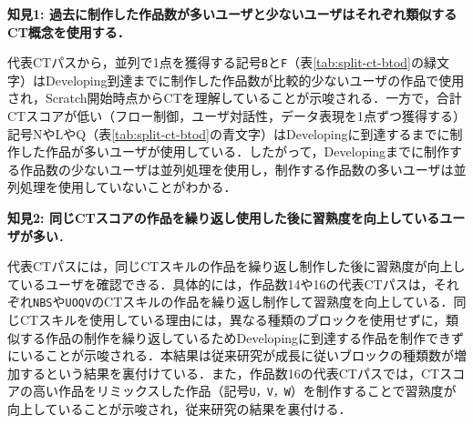 \documentclass[submit]{ipsj}
\begin{document}
\noindent\textbf{知見1: 過去に制作した作品数が多いユーザと少ないユーザはそれぞれ類似するCT概念を使用する．}

代表CTパスから，並列で1点を獲得する記号\texttt{\large{B}}と\texttt{\large{F}}（表\ref{tab:split-ct-btod}の緑文字）はDeveloping到達までに制作した作品数が比較的少ないユーザの作品で使用され，Scratch開始時点からCTを理解していることが示唆される．一方で，合計CTスコアが低い（フロー制御，ユーザ対話性，データ表現を1点ずつ獲得する）記号NやLやQ（表\ref{tab:split-ct-btod}の青文字）はDevelopingに到達するまでに制作した作品が多いユーザが使用している．したがって，Developingまでに制作する作品数の少ないユーザは並列処理を使用し，制作する作品数の多いユーザは並列処理を使用していないことがわかる．

\noindent\textbf{知見2: 同じCTスコアの作品を繰り返し使用した後に習熟度を向上しているユーザが多い}．

代表CTパスには，同じCTスキルの作品を繰り返し制作した後に習熟度が向上しているユーザを確認できる．具体的には，作品数14や16の代表CTパスは，それぞれ\texttt{\large{NBS}}や\texttt{\large{UOQV}}のCTスキルの作品を繰り返し制作して習熟度を向上している．同じCTスキルを使用している理由には，異なる種類のブロックを使用せずに，類似する作品の制作を繰り返しているためDevelopingに到達する作品を制作できずにいることが示唆される．本結果は従来研究\cite{Yang_2015}が成長に従いブロックの種類数が増加するという結果を裏付けている．また，作品数16の代表CTパスでは，CTスコアの高い作品をリミックスした作品（記号\texttt{\large{U，V，W}}）を制作することで習熟度が向上していることが示唆され，従来研究\cite{Yang_2015}の結果を裏付ける．

\end{document}
